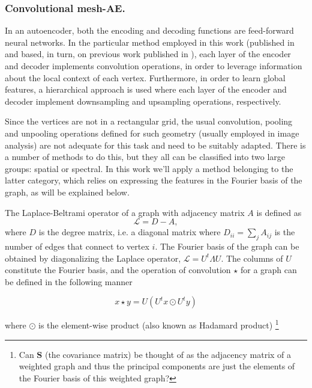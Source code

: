 \documentclass[twocolumn]{llncs}
\begin{document}
\subsubsection{Convolutional mesh-AE.}

In an autoencoder, both the encoding and decoding functions are feed-forward neural networks.
In the particular method employed in this work (published in \cite{ref_coma} and based, in turn, on previous work published in \cite{ref_spectral_graph_conv}), each layer of the encoder and decoder implements convolution operations, in order to leverage information about the local context of each vertex. Furthermore, in order to learn global features, a hierarchical approach is used where each layer of the encoder and decoder implement downsampling and upsampling operations, respectively. 
 
Since the vertices are not in a rectangular grid, the usual convolution, pooling and unpooling operations defined for such geometry (usually employed in image analysis) are not adequate for this task and need to be suitably adapted. There is a number of methods to do this, but they all can be classified into two large groups: spatial or spectral. In this work we'll apply a method belonging to the latter category, which relies on expressing the features in the Fourier basis of the graph, as will be explained below.

The Laplace-Beltrami operator of a graph with adjacency matrix $A$ is defined as
\begin{equation}
\mathcal{L}=D-A,
\end{equation}{}
\noindent 
where $D$ is the degree matrix, i.e. a diagonal matrix where $D_{ii}=\sum_{j}A_{ij}$ is the number of edges that connect to vertex $i$. The Fourier basis of the graph can be obtained by diagonalizing the Laplace operator, $\mathcal{L}=U^t\Lambda U$. The columns of $U$ constitute the Fourier basis, and the operation of convolution $\star$ for a graph can be defined in the following manner

\begin{equation}
x\star y =U(U^tx\odot U^ty)
\end{equation}{}

\noindent where $\odot$ is the element-wise product (also known as Hadamard product)
\footnote{Can $\textbf{S}$ (the covariance matrix) be thought of as the adjacency matrix of a weighted graph and thus the principal components are just the elements of the Fourier basis of this weighted graph?}
\end{document}
